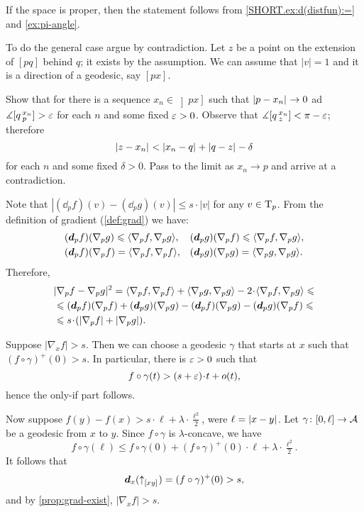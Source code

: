 If the space is proper, then the statement follows from \ref{SHORT.ex:d(distfun):=} and \ref{ex:pi-angle}.

To do the general case argue by contradiction.
Let $z$ be a point on the extension of $[pq]$ behind $q$;
it exists by the assumption.
We can assume that $|v|=1$ and it is a direction of a geodesic, say $[px]$.

Show that for there is a sequence $x_n\in \left]px\right]$ such that $|{p}-{x_n}|_{}^{{}}\to0$ ad
$\measuredangle [q\,{}^{x_n}_{p}]>\varepsilon$ for each $n$ and some fixed $\varepsilon>0$.
Observe that $\measuredangle[q\,{}^{x_n}_{z}]<\pi-\varepsilon$; therefore
\[\dist{z}{x_n}{}<\dist{x_n}{q}{}+\dist{q}z{}-\delta\]
for each $n$ and some fixed $\delta>0$.
Pass to the limit as $x_n\to p$ and arrive at a contradiction.

Note that
$|(\dd_p f)(v)-(\dd_p g)(v)|\le s\cdot|v|$
for any $v\in \mathrm{T}_p$.
From the definition of gradient (\ref{def:grad}) we have:
\begin{align*}
&(\bm{d}_p f)(\nabla_p g)\leqslant\langle\nabla_p f,\nabla_p g\rangle,
&&(\bm{d}_p g)(\nabla_p f)\leqslant\langle\nabla_p f,\nabla_p g\rangle,
\\
&(\bm{d}_p f)(\nabla_p f)=\langle\nabla_p f,\nabla_p f\rangle,
&&(\bm{d}_p g)(\nabla_p g)=\langle\nabla_p g,\nabla_p g\rangle.
\end{align*}
Therefore,
\begin{align*}
&\dist[2]{\nabla_pf}{\nabla_pg}{}
=\<\nabla_p f,\nabla_p f\>+\<\nabla_p g,\nabla_p g\>-2\cdot\<\nabla_p f,\nabla_p g\>
\le
\\
&\le (\dd_p f)(\nabla_p f)+(\dd_p g)(\nabla_p g)-
(\dd_p f)(\nabla_p g)-(\dd_p g)(\nabla_p f)
\le
\\
&\le s\cdot(|\nabla_p f|+|\nabla_p g|).
\end{align*}

Suppose $|\nabla_xf|> s$.
Then we can choose a geodesic $\gamma$ that starts at $x$ such that 
$(f\circ\gamma)^+(0)>s$.
In particular, there is $\varepsilon>0$ such that
\[f\circ\gamma(t)>(s+\eps)\cdot t+o(t),\]
hence the only-if part follows.

Now suppose $f(y)-f(x)>s\cdot \ell+\lambda\cdot \tfrac{\ell^2}2$,
were $\ell=|{x}-{y}|_{}^{{}}$.
Let $\gamma\colon[0,\ell]\to \mathcal{A}$ be a geodesic from $x$ to $y$.
Since $f\circ\gamma$ is $\lambda$-concave, we have
\[f\circ\gamma(\ell)\le f\circ\gamma(0)+(f\circ\gamma)^+(0)\cdot\ell+\lambda\cdot \tfrac{\ell^2}2.\]
It follows that 
\[\bm{d}_x({\uparrow}_{[{x}{y}]_{{}}})=(f\circ\gamma)^+(0)>s,\]
and by \ref{prop:grad-exist}, $|\nabla_x f|>s$.

